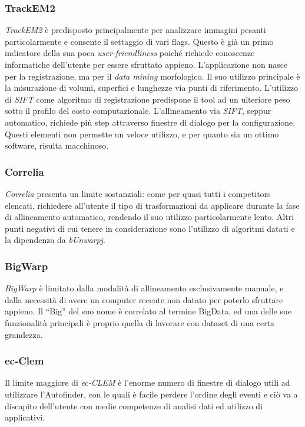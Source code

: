 \subsubsection{TrackEM2}
\noindent \textit{TrackEM2} è predisposto principalmente per analizzare immagini pesanti particolarmente e consente il settaggio di vari flags.
Questo è già un primo indicatore della sua poca \textit{user-friendliness} poiché richiede conoscenze informatiche dell'utente per essere sfruttato appieno. L'applicazione non nasce per la registrazione, ma per il \textit{data mining} morfologico. Il suo utilizzo principale è la misurazione di volumi, superfici e lunghezze via punti di riferimento. L'utilizzo di \textit{SIFT} come algoritmo di registrazione predispone il tool ad un ulteriore peso sotto il profilo del costo computazionale. L'allineamento via \textit{SIFT}, seppur automatico, richiede più step attraverso finestre di dialogo per la configurazione. Questi elementi non permette un veloce utilizzo, e per quanto sia un ottimo software, risulta macchinoso.

\subsubsection{Correlia}
\noindent \textit{Correlia} presenta un limite sostanziali: come per quasi tutti i competitors elencati, richiedere all'utente il tipo di trasformazioni da applicare durante la fase di allineamento automatico, rendendo il suo utilizzo particolarmente lento. Altri punti negativi di cui tenere in considerazione sono l'utilizzo di algoritmi datati e la dipendenza da \textit{bUnwarpj}.

\subsubsection{BigWarp}
\noindent \textit{BigWarp} è limitato dalla modalità di allineamento esclusivamente manuale, e dalla necessità di avere un computer recente non datato per poterlo sfruttare appieno. Il ``Big'' del suo nome è correlato al termine BigData, ed una delle sue funzionalità principali è proprio quella di lavorare con dataset di una certa grandezza.

\subsubsection{ec-Clem}
\noindent Il limite maggiore di \textit{ec-CLEM} è l'enorme numero di finestre di dialogo utili ad utilizzare l'Autofinder, con le quali è facile perdere l'ordine degli eventi e ciò va a discapito dell'utente con medie competenze di analisi dati ed utilizzo di applicativi.

